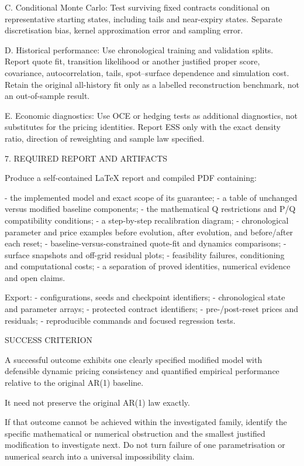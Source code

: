 \documentclass[11pt,a4paper]{article}
\numberwithin{equation}{section}
\theoremstyle{definition}\newtheorem{definition}[theorem]{Definition}
\theoremstyle{remark}\newtheorem{remark}[theorem]{Remark}
\begin{document}
C. Conditional Monte Carlo:
Test surviving fixed contracts conditional on representative starting
states, including tails and near-expiry states. Separate discretisation
bias, kernel approximation error and sampling error.

D. Historical performance:
Use chronological training and validation splits. Report quote fit,
transition likelihood or another justified proper score, covariance,
autocorrelation, tails, spot–surface dependence and simulation cost.
Retain the original all-history fit only as a labelled reconstruction
benchmark, not an out-of-sample result.

E. Economic diagnostics:
Use OCE or hedging tests as additional diagnostics, not substitutes for
the pricing identities. Report ESS only with the exact density ratio,
direction of reweighting and sample law specified.

7. REQUIRED REPORT AND ARTIFACTS

Produce a self-contained LaTeX report and compiled PDF containing:

- the implemented model and exact scope of its guarantee;
- a table of unchanged versus modified baseline components;
- the mathematical Q restrictions and P/Q compatibility conditions;
- a step-by-step recalibration diagram;
- chronological parameter and price examples before evolution,
  after evolution, and before/after each reset;
- baseline-versus-constrained quote-fit and dynamics comparisons;
- surface snapshots and off-grid residual plots;
- feasibility failures, conditioning and computational costs;
- a separation of proved identities, numerical evidence and open claims.

Export:
- configurations, seeds and checkpoint identifiers;
- chronological state and parameter arrays;
- protected contract identifiers;
- pre-/post-reset prices and residuals;
- reproducible commands and focused regression tests.

SUCCESS CRITERION

A successful outcome exhibits one clearly specified modified model
with defensible dynamic pricing consistency and quantified empirical
performance relative to the original AR(1) baseline.

It need not preserve the original AR(1) law exactly.

If that outcome cannot be achieved within the investigated family,
identify the specific mathematical or numerical obstruction and the
smallest justified modification to investigate next. Do not turn failure
of one parametrisation or numerical search into a universal
impossibility claim.
\end{document}
